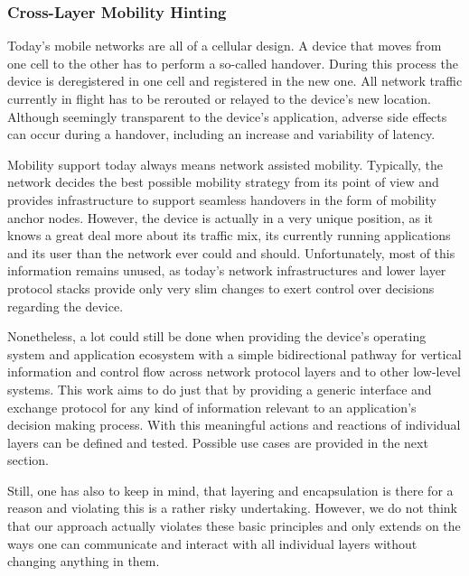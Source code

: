 \subsubsection{Cross-Layer Mobility Hinting}

Today's mobile networks are all of a cellular design. A device that moves from one cell to the other has to perform a so-called handover. During this process the device is deregistered in one cell and registered in the new one. All network traffic currently in flight has to be rerouted or relayed to the device's new location. 
Although seemingly transparent to the device's application, adverse side effects can occur during a handover, including an increase and variability of latency. 

Mobility support today always means network assisted mobility. Typically, the network decides the best possible mobility strategy from its point of view and provides infrastructure to support seamless handovers in the form of mobility anchor nodes. However, the device is actually in a very unique position, as it knows a great deal more about its traffic mix, its currently running applications and its user than the network ever could and should.
Unfortunately, most of this information remains unused, as today's network infrastructures and lower layer protocol stacks provide only very slim changes to exert control over decisions regarding the device.

Nonetheless, a lot could still be done when providing the device's operating system and application ecosystem with a simple bidirectional pathway for vertical information and control flow across network protocol layers and to other low-level systems. This work aims to do just that by providing a generic interface and exchange protocol for any kind of information relevant to an application's decision making process. With this meaningful actions and reactions of individual layers can be defined and tested. Possible use cases are provided in the next section.

Still, one has also to keep in mind, that layering and encapsulation is there for a reason and violating this is a rather risky undertaking. However, we do not think that our approach actually violates these basic principles and only extends on the ways one can communicate and interact with all individual layers without changing anything in them.



